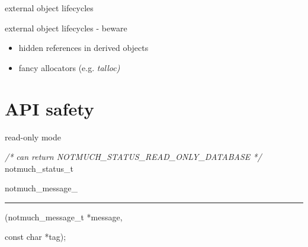 \documentclass[ignorenonframetext,aspectratio=169]{beamer}
\newenvironment{Shaded}{}{}
\newcommand{\KeywordTok}[1]{\textcolor[rgb]{0.00,0.44,0.13}{\textbf{{#1}}}}
\newcommand{\DataTypeTok}[1]{\textcolor[rgb]{0.56,0.13,0.00}{{#1}}}
\newcommand{\StringTok}[1]{\textcolor[rgb]{0.25,0.44,0.63}{{#1}}}
\newcommand{\CommentTok}[1]{\textcolor[rgb]{0.38,0.63,0.69}{\textit{{#1}}}}
\newcommand{\OtherTok}[1]{\textcolor[rgb]{0.00,0.44,0.13}{{#1}}}
\newcommand{\FunctionTok}[1]{\textcolor[rgb]{0.02,0.16,0.49}{{#1}}}
\newcommand{\NormalTok}[1]{{#1}}
\providecommand{\tightlist}{%
  \setlength{\itemsep}{0pt}\setlength{\parskip}{0pt}}
\newcommand\greyuline{\bgroup\markoverwith
    {\textcolor{lightgray}{\rule[-0.5ex]{2pt}{0.4pt}}}\ULon}
\begin{document}
\begin{frame}[fragile]{external object lifecycles}

\begin{Shaded}
\end{Shaded}

\end{frame}

\begin{frame}{external object lifecycles - beware}
\begin{itemize}
\tightlist
\item
  hidden references in derived objects
\item
  fancy allocators (e.g. \em{talloc})
\end{itemize}
\end{frame}

\section{API safety}\label{api-safety}

\begin{frame}[fragile]{read-only mode}

\begin{Shaded}
\begin{Highlighting}[]
\CommentTok{/* can return NOTMUCH_STATUS_READ_ONLY_DATABASE */}
\NormalTok{notmuch_status_t}
\NormalTok{notmuch_message_\greyuline{add_tag} (notmuch_message_t *message, }\DataTypeTok{const} \DataTypeTok{char} \NormalTok{*tag);}
\end{Highlighting}
\end{Shaded}

\end{frame}
\end{document}
